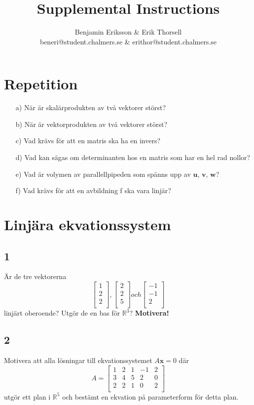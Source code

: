 \documentclass{article}
\title{Supplemental Instructions}
\author{Benjamin Eriksson \& Erik Thorsell \\ 
		\small{beneri@student.chalmers.se} \&
		\small{erithor@student.chalmers.se}
}
\date{
     }
\begin{document}
\maketitle


\section*{Repetition}
\begin{itemize}
\item[a) ] När är skalärprodukten av två vektorer störst?
\item[b) ] När är vektorprodukten av två vektorer störst?
\item[c) ] Vad krävs för att en matris ska ha en invers?
\item[d) ] Vad kan sägas om determinanten hos en matris som har en hel rad nollor?
\item[e) ] Vad är volymen av parallellpipeden som spänns upp av $\mathbf{u}$, $\mathbf{v}$, $\mathbf{w}$? 
\item[f) ] Vad krävs för att en avbildning f ska vara linjär?
\end{itemize}


\section*{Linjära ekvationssystem}
\subsection*{1}
Är de tre vektorerna
$$
\begin{bmatrix}
    1 \\
    2 \\
    2 \\
\end{bmatrix}
,
\begin{bmatrix}
    2 \\
    2 \\
    5 \\
\end{bmatrix}
och
\begin{bmatrix}
    -1 \\
    -1 \\
     2 \\
\end{bmatrix}
$$
linjärt oberoende? Utgör de en bas för $\mathbb{R}^3$? {\bf Motivera!}

\subsection*{2}
Motivera att alla lösningar till ekvationssystemet $A \mathbf{x} = 0$ där 
$$ A = 
\begin{bmatrix}
    1  &  2  &  1  & -1  &  2 \\
    3  &  4  &  5  &  2  &  0 \\
    2  &  2  &  1  &  0  &  2 \\
\end{bmatrix}
$$
utgör ett plan i $\mathbb{R}^5$ och bestämt en ekvation på parameterform för 
detta plan.
\end{document}
